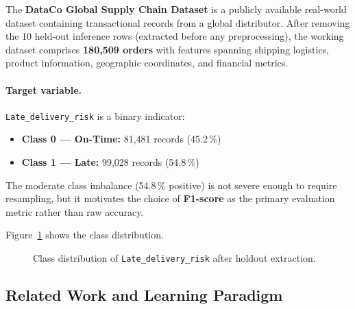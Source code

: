 \documentclass[12pt,a4paper]{article}
\begin{document}
The \textbf{DataCo Global Supply Chain Dataset} is a publicly available
real-world dataset containing transactional records from a global distributor.
After removing the 10 held-out inference rows (extracted before any
preprocessing), the working dataset comprises \textbf{180,509 orders} with
features spanning shipping logistics, product information, geographic
coordinates, and financial metrics.

\paragraph{Target variable.}
\texttt{Late\_delivery\_risk} is a binary indicator:
\begin{itemize}[itemsep=2pt]
  \item \textbf{Class 0 --- On-Time:} 81,481 records (45.2\,\%)
  \item \textbf{Class 1 --- Late:} 99,028 records (54.8\,\%)
\end{itemize}

The moderate class imbalance (54.8\,\% positive) is not severe enough to
require resampling, but it motivates the choice of \textbf{F1-score} as the
primary evaluation metric rather than raw accuracy.

Figure~\ref{fig:class_dist} shows the class distribution.

\begin{figure}[H]
\centering
{}
\caption{Class distribution of \texttt{Late\_delivery\_risk} after holdout extraction.}
\label{fig:class_dist}
\end{figure}

\subsection{Related Work and Learning Paradigm}
\end{document}

